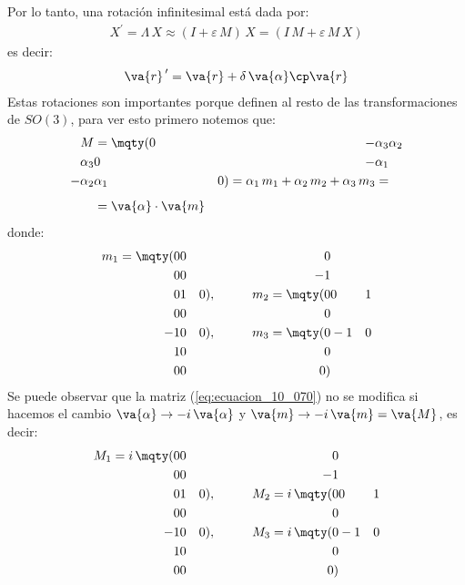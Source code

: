 Por lo tanto, una rotación infinitesimal está dada por:
\begin{align}
X^{\prime} = \Lambda \, X \approx ( I + \varepsilon \, M) \, X = (I \, M + \varepsilon \, M \, X)
\label{eq:ecuacion_10_068}
\end{align}
es decir:
\begin{align}
\va{r}^{\, \prime} = \va{r} + \delta \, \va{\alpha} \cp \va{r}
\label{eq:ecuacion_10_069}
\end{align}
Estas rotaciones son importantes porque definen al resto de las transformaciones de $SO(3)$, para ver esto primero notemos que:
\begin{align}
\begin{aligned}
M &= \mqty(0 & -\alpha_{3} & \alpha_{2} \\ \alpha_{3} & 0 & -\alpha_{1} \\ -\alpha_{2} & \alpha_{1} & 0) = \alpha_{1} \, m_{1} + \alpha_{2} \, m_{2} + \alpha_{3} \, m_{3} = \\[0.5em]
&= \va{\alpha} \cdot \va{m}
\end{aligned}
\label{eq:ecuacion_10_070}
\end{align}
donde:
\begin{align*}
m_{1} = \mqty(0 & 0 & 0 \\ 0 & 0 & -1 \\ 0 & 1 & 0), \hspace{1cm} m_{2} = \mqty(0 & 0 & 1 \\ 0 & 0 & 0 \\ -1 & 0 & 0), \hspace{1cm} m_{3} = \mqty(0 & -1 & 0 \\ 1 & 0 & 0 \\ 0 & 0 & 0)
\end{align*}
Se puede observar que la matriz (\ref{eq:ecuacion_10_070}) no se modifica si hacemos el cambio $\va{\alpha} \rightarrow - i \, \va{\alpha}$ y $\va{m} \rightarrow - i \, \va{m} = \va{M}$, es decir:
\begin{align*}
M_{1} = i \, \mqty(0 & 0 & 0 \\ 0 & 0 & -1 \\ 0 & 1 & 0), \hspace{1cm} M_{2} = i \, \mqty(0 & 0 & 1 \\ 0 & 0 & 0 \\ -1 & 0 & 0), \hspace{1cm} M_{3} = i \, \mqty(0 & -1 & 0 \\ 1 & 0 & 0 \\ 0 & 0 & 0)
\end{align*}
